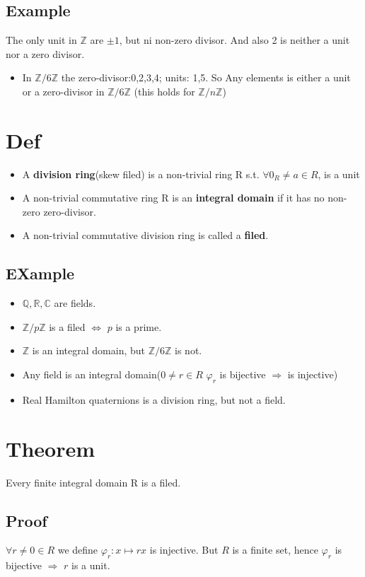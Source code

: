 \documentclass{book}
\begin{document}
\subsection*{Example}
The only unit in $\mathbb Z$ are $\pm 1$, but ni non-zero divisor. And also 2 is neither a unit nor a zero divisor.
\begin{itemize}
	\item In $\mathbb Z/6\mathbb Z$ the zero-divisor:0,2,3,4; units: 1,5. So Any elements is either a unit or a zero-divisor in $\mathbb Z/6\mathbb Z$ (this holds for $\mathbb Z/n\mathbb Z$)
\end{itemize}
\section{Def}
\begin{itemize}
	\item A \textbf{division ring}(skew filed) is a non-trivial ring R s.t. $\forall 0_R\neq a\in R$, is a unit
	\item A non-trivial commutative ring R is an \textbf{integral domain} if it has no non-zero zero-divisor.
	\item A non-trivial commutative division ring is called a \textbf{filed}. 
\end{itemize}
\subsection*{EXample}
\begin{itemize}
	\item $\mathbb Q,\mathbb R,\mathbb C$ are fields.
	\item $\mathbb Z/p\mathbb Z$ is a filed $\Leftrightarrow$ $p$ is a prime. 
	\item $\mathbb Z$ is an integral domain, but $\mathbb Z/6\mathbb Z$ is not.
	\item Any field is an integral domain($0\neq r\in R$ $\varphi_r$ is bijective $\Rightarrow$ is injective)
	\item Real Hamilton quaternions is a division ring, but not a field.
\end{itemize}
\section{Theorem}
Every finite integral domain R is a filed.
\subsection*{Proof}
$\forall r\neq 0\in R$ we define $\varphi_r:x\mapsto rx$ is injective. But $R$ is a finite set, hence $\varphi_r$ is bijective $\Rightarrow$ $r$ is a unit.
\end{document}
